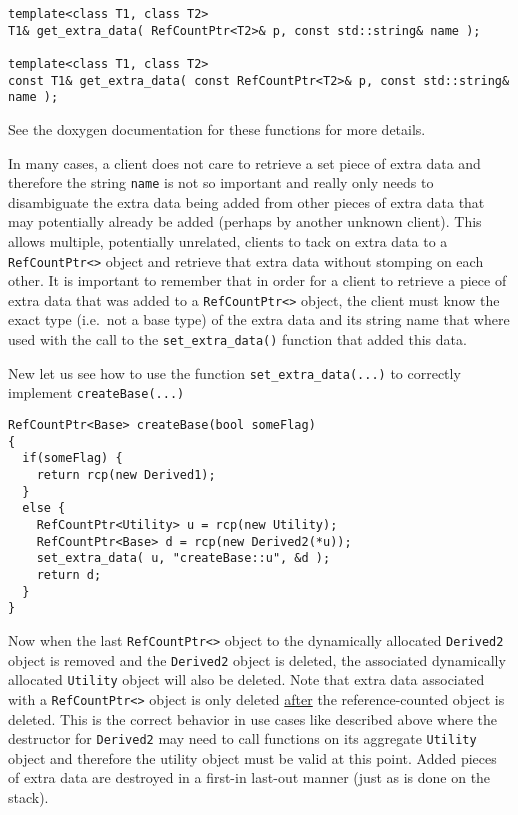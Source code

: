 {\scriptsize\begin{verbatim}
template<class T1, class T2>
T1& get_extra_data( RefCountPtr<T2>& p, const std::string& name );

template<class T1, class T2>
const T1& get_extra_data( const RefCountPtr<T2>& p, const std::string& name );
\end{verbatim}}

{}\noindent{} See the doxygen documentation for these functions for
more details.

In many cases, a client does not care to retrieve a set piece of extra
data and therefore the string \texttt{name} is not so important and
really only needs to disambiguate the extra data being added from
other pieces of extra data that may potentially already be added
(perhaps by another unknown client).  This allows multiple,
potentially unrelated, clients to tack on extra data to a
{}\texttt{RefCountPtr<>} object and retrieve that extra data without
stomping on each other.  It is important to remember that in order for
a client to retrieve a piece of extra data that was added to a
{}\texttt{RefCountPtr<>} object, the client must know the exact type
(i.e.~not a base type) of the extra data and its string name that
where used with the call to the {}\texttt{set\-\_extra\-\_data()}
function that added this data.

New let us see how to use the function {}\texttt{set\-\_extra\-\_data(...)}
to correctly implement {}\texttt{create\-Base(...)}

{\scriptsize\begin{verbatim}
RefCountPtr<Base> createBase(bool someFlag)
{
  if(someFlag) {
    return rcp(new Derived1);
  }
  else {
    RefCountPtr<Utility> u = rcp(new Utility);
    RefCountPtr<Base> d = rcp(new Derived2(*u));
    set_extra_data( u, "createBase::u", &d );
    return d;
  }
}
\end{verbatim}}

{}\noindent{}Now when the last {}\texttt{RefCountPtr<>} object to the
dynamically allocated {}\texttt{Derived2} object is removed and the
{}\texttt{Derived2} object is deleted, the associated dynamically
allocated {}\texttt{Utility} object will also be deleted.  Note that
extra data associated with a {}\texttt{RefCountPtr<>} object is only
deleted \underline{after} the reference-counted object is deleted.
This is the correct behavior in use cases like described above where
the destructor for {}\texttt{Derived2} may need to call functions on
its aggregate {}\texttt{Utility} object and therefore the utility
object must be valid at this point.  Added pieces of extra data are
destroyed in a first-in last-out manner (just as is done on the
stack).

